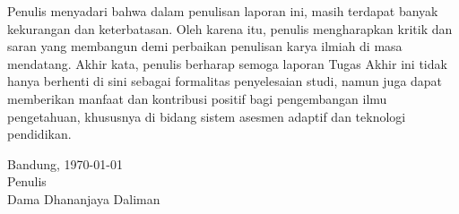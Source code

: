 Penulis menyadari bahwa dalam penulisan laporan ini, masih terdapat banyak kekurangan dan keterbatasan. Oleh karena itu, penulis mengharapkan kritik dan saran yang membangun demi perbaikan penulisan karya ilmiah di masa mendatang. Akhir kata, penulis berharap semoga laporan Tugas Akhir ini tidak hanya berhenti di sini sebagai formalitas penyelesaian studi, namun juga dapat memberikan manfaat dan kontribusi positif bagi pengembangan ilmu pengetahuan, khususnya di bidang sistem asesmen adaptif dan teknologi pendidikan.

\begin{flushright}
    Bandung, \today\\
    \vspace{0.8cm}
    Penulis \\
    \vspace{1.2cm}
    Dama Dhananjaya Daliman \\
\end{flushright}
